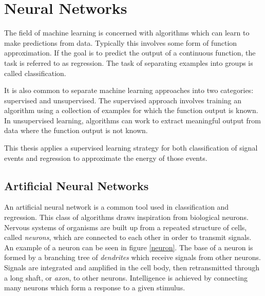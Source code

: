 \chapter{Neural Networks}
\label{nnet_chapter}

The field of machine learning is concerned with algorithms which can learn to make predictions from data.  Typically this involves some form of function approximation.  If the goal is to predict the output of a continuous function, the task is referred to as regression.  The task of separating examples into groups is called classification.

It is also common to separate machine learning approaches into two categories: supervised and unsupervised.  The supervised approach involves training an algorithm using a collection of examples for which the function output is known.  In unsupervised learning, algorithms can work to extract meaningful output from data where the function output is not known.

This thesis applies a supervised learning strategy for both classification of signal events and regression to approximate the energy of those events.

\section{Artificial Neural Networks}

An artificial neural network is a common tool used in classification and regression.  This class of algorithms draws inspiration from biological neurons.  Nervous systems of organisms are built up from a repeated structure of cells, called \textit{neurons}, which are connected to each other in order to transmit signals.  An example of a neuron can be seen in figure \ref{neuron}.  The base of a neuron is formed by a branching tree of \textit{dendrites} which receive signals from other neurons.  Signals are integrated and amplified in the cell body, then retransmitted through a long shaft, or \textit{axon}, to other neurons.  Intelligence is achieved by connecting many neurons which form a response to a given stimulus.


